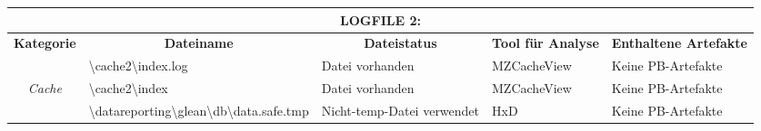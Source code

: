 \begin{appendices}
{\begin{landscape}
\begin{table}[h!]
{\begin{tabular}{cllll}
	\multicolumn{5}{c}{\textbf{LOGFILE 2:}}                                                                                                                                                                                                                                                                                                                                                                                                                                                                                                                     \\ \hline
	\multicolumn{1}{|c|}{\textbf{Kategorie}}                                                                     & \multicolumn{1}{c|}{\textbf{Dateiname}}                                                                                                                                                                             & \multicolumn{1}{c|}{\textbf{Dateistatus}}                                                         & \multicolumn{1}{c|}{\textbf{Tool für Analyse}}   & \multicolumn{1}{l|}{\textbf{Enthaltene Artefakte}}              \\ \hline
	\multicolumn{1}{|c|}{}                                                                                       & \multicolumn{1}{l|}{\cellcolor[HTML]{34CDF9}\textbackslash{}cache2\textbackslash{}index.log}                                                                                                                        & \multicolumn{1}{l|}{\cellcolor[HTML]{009901}Datei vorhanden}                                      & \multicolumn{1}{l|}{MZCacheView}            & \multicolumn{1}{l|}{\cellcolor[HTML]{F8A102}Keine PB-Artefakte} \\ \cline{2-5} 
	\multicolumn{1}{|c|}{\multirow{-2}{*}{\textit{Cache}}}                                                       & \multicolumn{1}{l|}{\cellcolor[HTML]{34CDF9}\textbackslash{}cache2\textbackslash{}index}                                                                                                                            & \multicolumn{1}{l|}{\cellcolor[HTML]{009901}Datei vorhanden}                                      & \multicolumn{1}{l|}{MZCacheView}            & \multicolumn{1}{l|}{\cellcolor[HTML]{F8A102}Keine PB-Artefakte} \\ \hline
	\multicolumn{1}{|c|}{}                                                                                       & \multicolumn{1}{l|}{\cellcolor[HTML]{3190FF}\textbackslash{}datareporting\textbackslash{}glean\textbackslash{}db\textbackslash{}data.safe.tmp}                                                                      & \multicolumn{1}{l|}{\cellcolor[HTML]{FCFF2F}Nicht-temp-Datei verwendet}                           & \multicolumn{1}{l|}{HxD}                         & \multicolumn{1}{l|}{\cellcolor[HTML]{F8A102}Keine PB-Artefakte} \\ \cline{2-5} 

\end{tabular}}
\end{table}
\end{landscape}}
\end{appendices}
